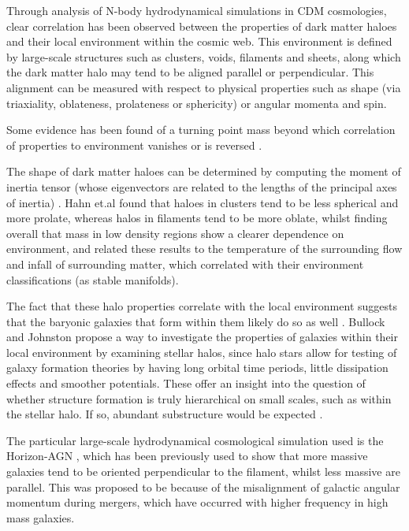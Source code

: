 Through analysis of N-body hydrodynamical simulations in CDM cosmologies, clear correlation has been observed between the properties of dark matter haloes and their local environment within the cosmic web. This environment is defined by large-scale structures such as clusters, voids, filaments and sheets, along which the dark matter halo may tend to be aligned parallel or perpendicular. This alignment can be measured with respect to physical properties such as shape (via triaxiality, oblateness, prolateness or sphericity) or angular momenta and spin.  

Some evidence has been found of a turning point mass beyond which correlation of properties to environment vanishes or is reversed \cite{hahn07b} \cite{dubois14}. 

The shape of dark matter haloes can be determined by computing the moment of inertia tensor (whose eigenvectors are related to the lengths of the principal axes of inertia) \cite{hahn07a}. Hahn et.al \cite{hahn07a} found that haloes in clusters tend to be less spherical and more prolate, whereas halos in filaments tend to be more oblate, whilst finding overall that mass in low density regions show a clearer dependence on environment, and related these results to the temperature of the surrounding flow and infall of surrounding matter, which correlated with their environment classifications (as stable manifolds). 

The fact that these halo properties correlate with the local environment suggests that the baryonic galaxies that form within them likely do so as well \cite{hahn07b}.  Bullock and Johnston \cite{bullock05} propose a way to investigate the properties of galaxies within their local environment by examining stellar halos, since halo stars allow for testing of galaxy formation theories by having long orbital time periods, little dissipation effects and smoother potentials. These offer an insight into the question of whether structure formation is truly hierarchical on small scales, such as within the stellar halo. If so, abundant substructure would be expected \cite{bullock05}. 

The particular large-scale hydrodynamical cosmological simulation used is the Horizon-AGN \cite{dubois14}, which has been previously used to show that more massive galaxies tend to be oriented perpendicular to the filament, whilst less massive are parallel. This was proposed to be because of the misalignment of galactic angular momentum during mergers, which have occurred with higher frequency in high mass galaxies. 

